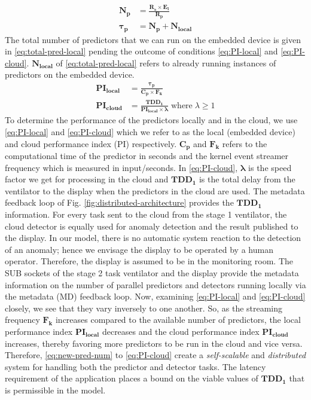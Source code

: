 \begin{align}
\label{eq:new-pred-num}
\bm{N_p} &= \bm{\frac{R_{s}\times E_{l}}{R_{p}}} \\
\label{eq:total-pred-local}
\bm{\tau_{p}} &= \bm{N_p + N_{local}}
\end{align}
The total number of predictors that we can run on the embedded device is given 
in \eqref{eq:total-pred-local} pending the outcome of conditions 
\eqref{eq:PI-local} and \eqref{eq:PI-cloud}. $ \bm{N_{local}} $ of 
\eqref{eq:total-pred-local} refers to already running instances of predictors 
on the embedded device.
\begin{align}
	\label{eq:PI-local}
	\bm{PI_{local}} & = \bm{\frac{\tau_{p}}{C_p\times F_k}} \\
	\label{eq:PI-cloud}
	\bm{PI_{cloud}} &= \bm{\frac{TDD_1}{PI_{local}\times \lambda}}\; 
	\text{where} \; \lambda \ge 1
\end{align}
To determine the performance of the predictors locally and in the cloud, we use 
\eqref{eq:PI-local} and \eqref{eq:PI-cloud} which we refer to as the local 
(embedded device) and cloud performance index (PI) respectively. $ \bm{C_p} $ 
and $ 
\bm{F_k} $ refers to the computational time of the predictor in seconds and the 
kernel event streamer frequency which is measured in input/seconds. In 
\eqref{eq:PI-cloud}, $ \bm{\lambda} $ is the speed factor we get for processing 
in the cloud and $ \bm{TDD_1} $ is the total delay from the ventilator to the 
display when the predictors in the cloud are used. The metadata feedback loop 
of Fig. \ref{fig:distributed-architecture} provides the $ \bm{TDD_1} $ 
information. For every task sent to the cloud from the stage 1 ventilator, the 
cloud detector is equally used for anomaly detection and the result published 
to the display. In our model, there is no automatic system reaction to the 
detection of an anomaly; hence we envisage the display to be operated by a 
human operator. Therefore, the display is assumed to be in the monitoring room. 
The SUB sockets of the stage 2 task ventilator and the display provide the 
metadata information on the number of parallel predictors and detectors running 
locally via the metadata (MD) feedback loop.
Now, examining \eqref{eq:PI-local} and \eqref{eq:PI-cloud} closely, we see that 
they vary inversely to one another. So, as the streaming frequency $ \bm{F_k} $ 
increases compared to the available number of predictors, the local performance 
index $ \bm{PI_{local}} $ decreases and the cloud performance index $ 
\bm{PI_{cloud}} $ increases, thereby favoring more predictors to be run in the 
cloud and vice versa. Therefore, \eqref{eq:new-pred-num} to \eqref{eq:PI-cloud} 
create a \emph{self-scalable} and \emph{distributed} system for handling both 
the predictor and detector tasks. The latency requirement of the application 
places a bound on the viable values of $ \bm{TDD_1} $ that is permissible in 
the model.

